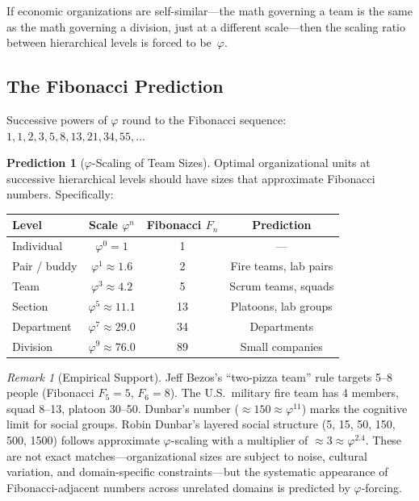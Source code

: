 \documentclass[11pt,a4paper]{article}
\theoremstyle{plain}
\theoremstyle{definition}
\newtheorem{prediction}[theorem]{Prediction}
\theoremstyle{remark}
\newtheorem{remark}[theorem]{Remark}
\begin{document}
If economic organizations are self-similar---the math governing a team is the same as the math governing a division, just at a different scale---then the scaling ratio between hierarchical levels is forced to be~$\varphi$.

\subsection{The Fibonacci Prediction}

Successive powers of $\varphi$ round to the Fibonacci sequence: $1, 1, 2, 3, 5, 8, 13, 21, 34, 55, \ldots$

\begin{prediction}[$\varphi$-Scaling of Team Sizes]\label{pred:teams}
Optimal organizational units at successive hierarchical levels should have sizes that approximate Fibonacci numbers.
Specifically:
\begin{center}
\begin{tabular}{@{}lccc@{}}
\toprule
\textbf{Level} & \textbf{Scale $\varphi^n$} & \textbf{Fibonacci $F_n$} & \textbf{Prediction} \\
\midrule
Individual & $\varphi^0 = 1$ & 1 & --- \\
Pair / buddy & $\varphi^1 \approx 1.6$ & 2 & Fire teams, lab pairs \\
Team & $\varphi^3 \approx 4.2$ & 5 & Scrum teams, squads \\
Section & $\varphi^5 \approx 11.1$ & 13 & Platoons, lab groups \\
Department & $\varphi^7 \approx 29.0$ & 34 & Departments \\
Division & $\varphi^9 \approx 76.0$ & 89 & Small companies \\
\bottomrule
\end{tabular}
\end{center}
\end{prediction}

\begin{remark}[Empirical Support]
Jeff Bezos's ``two-pizza team'' rule targets 5--8 people (Fibonacci $F_5 = 5$, $F_6 = 8$).
The U.S.\ military fire team has 4 members, squad 8--13, platoon 30--50.
Dunbar's number ($\approx 150 \approx \varphi^{11}$) marks the cognitive limit for social groups.
Robin Dunbar's layered social structure (5, 15, 50, 150, 500, 1500) follows approximate $\varphi$-scaling with a multiplier of $\approx 3 \approx \varphi^{2.4}$.
These are not exact matches---organizational sizes are subject to noise, cultural variation, and domain-specific constraints---but the systematic appearance of Fibonacci-adjacent numbers across unrelated domains is predicted by $\varphi$-forcing.
\end{remark}
\end{document}
